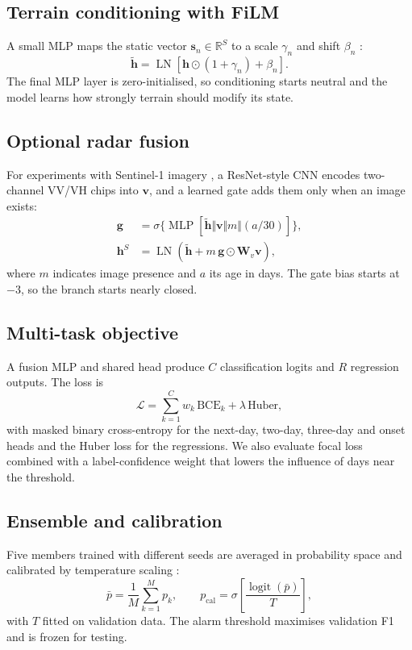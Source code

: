 \documentclass[conference]{IEEEtran}
\begin{document}
\subsection{Terrain conditioning with FiLM}
A small MLP maps the static vector $\mathbf{s}_n\in\mathbb{R}^{S}$ to a scale
$\gamma_n$ and shift $\beta_n$ \cite{perez2018}:
\begin{equation}
\widetilde{\mathbf{h}}=\operatorname{LN}[\mathbf{h}\odot(1+\gamma_n)+\beta_n].
\label{eq:film}
\end{equation}
The final MLP layer is zero-initialised, so conditioning starts neutral and the
model learns how strongly terrain should modify its state.

\subsection{Optional radar fusion}
For experiments with Sentinel-1 imagery \cite{torres2012}, a ResNet-style CNN
\cite{he2016} encodes two-channel VV/VH chips into $\mathbf{v}$, and a learned
gate adds them only when an image exists:
\begin{align}
\mathbf{g}&=\sigma\{\operatorname{MLP}[\widetilde{\mathbf{h}}\Vert\mathbf{v}\Vert m\Vert(a/30)]\},\\
\mathbf{h}^{S}&=\operatorname{LN}(\widetilde{\mathbf{h}}+m\,\mathbf{g}\odot\mathbf{W}_v\mathbf{v}),
\label{eq:radar}
\end{align}
where $m$ indicates image presence and $a$ its age in days. The gate bias starts
at $-3$, so the branch starts nearly closed.

\subsection{Multi-task objective}
A fusion MLP and shared head produce $C$ classification logits and $R$
regression outputs. The loss is
\begin{equation}
\mathcal{L}=\sum_{k=1}^{C} w_k\,\mathrm{BCE}_k+\lambda\,\mathrm{Huber},
\label{eq:loss}
\end{equation}
with masked binary cross-entropy for the next-day, two-day, three-day and onset
heads and the Huber loss \cite{huber1964} for the regressions. We also evaluate
focal loss \cite{lin2017} combined with a label-confidence weight that lowers
the influence of days near the threshold.

\subsection{Ensemble and calibration}
Five members trained with different seeds are averaged in probability space and
calibrated by temperature scaling \cite{lakshminarayanan2017,guo2017}:
\begin{equation}
\bar p=\frac{1}{M}\sum_{k=1}^{M}p_k,\qquad
p_{\mathrm{cal}}=\sigma\!\left[\frac{\operatorname{logit}(\bar p)}{T}\right],
\label{eq:calibration}
\end{equation}
with $T$ fitted on validation data. The alarm threshold maximises validation F1
and is frozen for testing.
\end{document}

